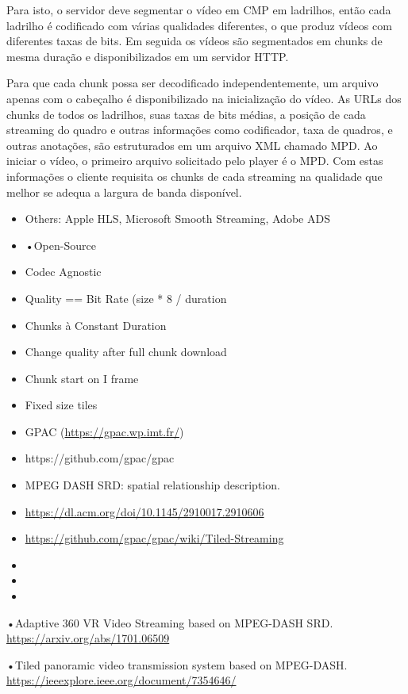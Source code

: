 Para isto, o servidor deve segmentar o vídeo em CMP em ladrilhos, então cada ladrilho é codificado com várias qualidades diferentes, o que produz vídeos com diferentes taxas de bits. Em seguida os vídeos são segmentados em chunks de mesma duração e disponibilizados em um servidor HTTP.

Para que cada chunk possa ser decodificado independentemente, um arquivo apenas com o cabeçalho é disponibilizado na inicialização do vídeo. As URLs dos chunks de todos os ladrilhos, suas taxas de bits médias, a posição de cada streaming do quadro e outras informações como codificador, taxa de quadros, e outras anotações, são estruturados em um arquivo XML chamado MPD. Ao iniciar o vídeo, o primeiro arquivo solicitado pelo player é o MPD. Com estas informações o cliente requisita os chunks de cada streaming na qualidade que melhor se adequa a largura de banda disponível.

\begin{itemize}
       \item Others: Apple HLS, Microsoft Smooth Streaming, Adobe ADS
       \item •Open-Source
       \item Codec Agnostic
       \item Quality == Bit Rate (size * 8 / duration
       \item Chunks à Constant Duration
       \item Change quality after full chunk download
       \item Chunk start on I frame
       \item Fixed size tiles
       \item GPAC (\url{https://gpac.wp.imt.fr/})
       \item https://github.com/gpac/gpac
       \item MPEG DASH SRD: spatial relationship description.
       \item \url{https://dl.acm.org/doi/10.1145/2910017.2910606}
       \item \url{https://github.com/gpac/gpac/wiki/Tiled-Streaming}
       \item
       \item
       \item


\end{itemize}


•Adaptive 360 VR Video Streaming based on MPEG-DASH SRD. \url{https://arxiv.org/abs/1701.06509}

•Tiled panoramic video transmission system based on MPEG-DASH. \url{https://ieeexplore.ieee.org/document/7354646/}

